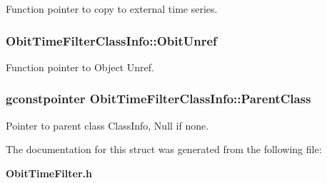 Function pointer to copy to external time series. 

\subsubsection{ {\bf Obit\-Time\-Filter\-Class\-Info::Obit\-Unref}}\label{structObitTimeFilterClassInfo_o11}


Function pointer to Object Unref. 

\subsubsection{\setlength{\rightskip}{0pt plus 5cm}gconstpointer {\bf Obit\-Time\-Filter\-Class\-Info::Parent\-Class}}\label{structObitTimeFilterClassInfo_o3}


Pointer to parent class Class\-Info, Null if none. 



The documentation for this struct was generated from the following file:\begin{CompactItemize}
\item 
{\bf Obit\-Time\-Filter.h}\end{CompactItemize}
